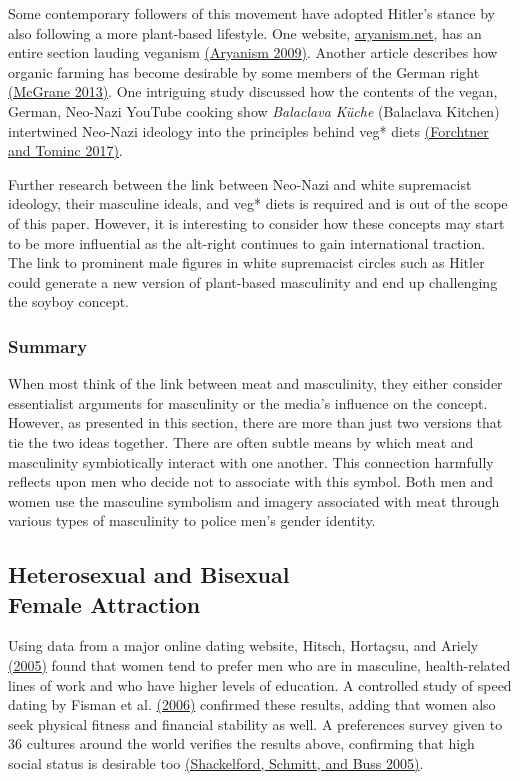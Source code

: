 \documentclass[twoside]{report}
\begin{document}
\begin{multicols*}{2}
Some contemporary followers of this movement have adopted Hitler's
stance by also following a more plant-based lifestyle. One website,
\href{https://www.aryanism.net}{aryanism.net}, has an entire section lauding veganism \hyperlink{aryanism}{(Aryanism 2009)}. Another article describes how organic farming has become desirable by some members of the German right \hyperlink{mcgrane}{(McGrane 2013)}. One intriguing study discussed how the contents of the vegan, German, Neo-Nazi YouTube cooking show \textit{Balaclava Küche} (Balaclava Kitchen) intertwined Neo-Nazi ideology into the principles behind veg* diets \hyperlink{forchtner}{(Forchtner and Tominc 2017)}.

Further research between the link between Neo-Nazi and white supremacist
ideology, their masculine ideals, and veg* diets is required and is out
of the scope of this paper. However, it is interesting to consider how
these concepts may start to be more influential as the alt-right
continues to gain international traction. The link to prominent male
figures in white supremacist circles such as Hitler could generate a new
version of plant-based masculinity and end up challenging the
soyboy concept.

\subsubsection{Summary}

When most think of the link between meat and masculinity, they either
consider essentialist arguments for masculinity or the media's influence
on the concept. However, as presented in this section, there are more
than just two versions that tie the two ideas together. There are often subtle means by which meat and masculinity symbiotically interact with one another. This connection harmfully reflects upon men who decide not to associate with this symbol. Both men and women use the masculine symbolism and imagery associated with meat through various types of masculinity to police men's gender identity.

\subsection[Heterosexual and Bisexual Female Attraction]{Heterosexual and Bisexual\\ Female Attraction}

Using data from a major online dating website, Hitsch, Hortaçsu, and
Ariely \hyperlink{hitsch1}{(2005)} found that women tend to prefer men who are in masculine, health-related lines of work and who have higher levels of education. A controlled study of speed dating by Fisman
et al. \hyperlink{fisman}{(2006)} confirmed these results, adding that women also seek physical fitness and financial stability as well. A preferences survey given to 36 cultures around the world verifies the results above, confirming that high social status is desirable too \hyperlink{shackelford}{(Shackelford, Schmitt, and Buss 2005)}.


\end{multicols*}
\end{document}

